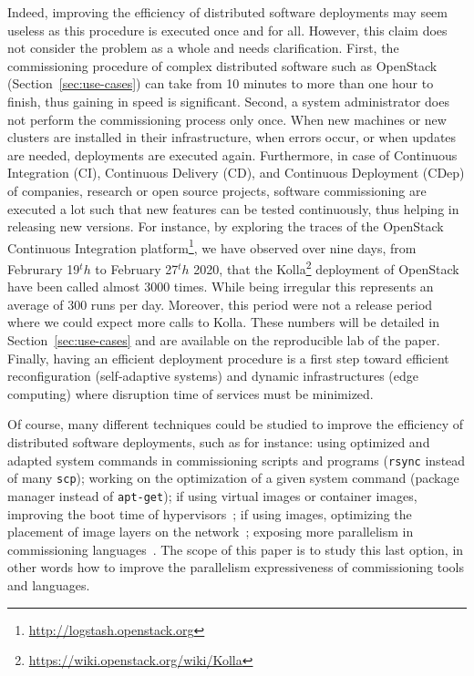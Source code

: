 Indeed, improving the efficiency of distributed software deployments may seem useless as this procedure is executed once and for all. However, this claim does not consider the problem as a whole and needs clarification. %
First, the commissioning procedure of complex distributed software such as OpenStack (Section~\ref{sec:use-cases}) can take from 10 minutes to more than
one hour to finish, thus gaining in speed is significant. Second, a system
administrator does not perform the commissioning process only once. When new
machines or new clusters are installed in their infrastructure, when errors
occur, or when updates are needed, deployments are executed again.
%
Furthermore, in case of Continuous Integration (CI), Continuous Delivery (CD), and Continuous Deployment (CDep) of companies, research or open source projects, software commissioning are executed a lot such that new features can be tested continuously, thus helping in releasing new versions. For instance, by exploring the traces of the OpenStack Continuous Integration platform\footnote{\url{http://logstash.openstack.org}}, we have observed over nine days, from Februrary 19$^th$ to February 27$^th$ 2020, that the Kolla\footnote{\url{https://wiki.openstack.org/wiki/Kolla}} deployment  of OpenStack have been called almost 3000 times. While being irregular this represents an average of 300 runs per day. Moreover, this period were not a release period where we could expect more calls to Kolla. These numbers will be detailed in Section~\ref{sec:use-cases} and are available on the reproducible lab of the paper.
%
Finally, having an efficient deployment procedure is a first step toward efficient reconfiguration (\eg self-adaptive systems) and dynamic infrastructures (\eg edge computing) where disruption time of services must be minimized.

Of course, many different techniques could be studied to improve the efficiency of distributed software deployments, such as for instance: using optimized and adapted system commands in commissioning scripts and programs (\eg \texttt{rsync} instead of many \texttt{scp}); working on the optimization of a given system command (\eg \nix package manager instead of \texttt{apt-get}); if using virtual images or container images, improving the boot time of hypervisors~\cite{nguyen:hal-02172288}; if using \docker images, optimizing the placement of image layers on the network~\cite{darrous:hal-01745405}; exposing more parallelism in commissioning languages~\cite{dicosmo:hal-01233489}. The scope of this paper is to study this last option, in other words how to improve the parallelism expressiveness of commissioning tools and languages.